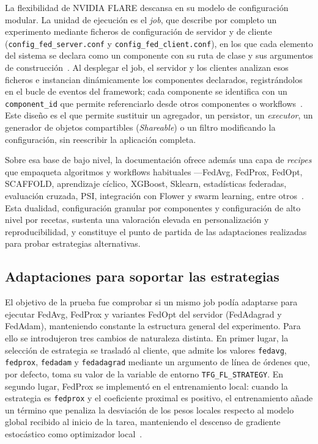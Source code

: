 La flexibilidad de NVIDIA FLARE descansa en su modelo de configuración modular. La
unidad de ejecución es el \textit{job}, que describe por completo un experimento
mediante ficheros de configuración de servidor y de cliente
(\texttt{config\_fed\_server.conf} y \texttt{config\_fed\_client.conf}), en los que
cada elemento del sistema se declara como un componente con su ruta de clase y sus
argumentos de construcción~\parencite{nvflareComponents}. Al desplegar el job, el
servidor y los clientes analizan esos ficheros e instancian dinámicamente los
componentes declarados, registrándolos en el bucle de eventos del framework; cada
componente se identifica con un \texttt{component\_id} que permite referenciarlo
desde otros componentes o workflows~\parencite{nvflareComponents}. Este diseño es
el que permite sustituir un agregador, un persistor, un \textit{executor}, un
generador de objetos compartibles (\textit{Shareable}) o un filtro modificando la
configuración, sin reescribir la aplicación completa.

Sobre esa base de bajo nivel, la documentación ofrece además una capa de
\textit{recipes} que empaqueta algoritmos y workflows habituales —FedAvg, FedProx,
FedOpt, SCAFFOLD, aprendizaje cíclico, XGBoost, Sklearn, estadísticas federadas,
evaluación cruzada, PSI, integración con Flower y swarm learning, entre
otros~\parencite{nvflareRecipes}. Esta dualidad, configuración granular por
componentes y configuración de alto nivel por recetas, sustenta una valoración
elevada en personalización y reproducibilidad, y constituye el punto de partida de
las adaptaciones realizadas para probar estrategias alternativas.

\subsection{Adaptaciones para soportar las estrategias}\label{subsec:flex-nvflare-adapt}

El objetivo de la prueba fue comprobar si un mismo job podía adaptarse para
ejecutar FedAvg, FedProx y variantes FedOpt del servidor (FedAdagrad y FedAdam),
manteniendo constante la estructura general del experimento. Para ello se
introdujeron tres cambios de naturaleza distinta. En primer lugar, la selección de
estrategia se trasladó al cliente, que admite los valores \texttt{fedavg},
\texttt{fedprox}, \texttt{fedadam} y \texttt{fedadagrad} mediante un argumento de
línea de órdenes que, por defecto, toma su valor de la variable de entorno
\texttt{TFG\_FL\_STRATEGY}. En segundo lugar, FedProx se implementó en el
entrenamiento local: cuando la estrategia es \texttt{fedprox} y el coeficiente
proximal es positivo, el entrenamiento añade un término que penaliza la desviación
de los pesos locales respecto al modelo global recibido al inicio de la tarea,
manteniendo el descenso de gradiente estocástico como optimizador
local~\parencite{nvflareAlgorithms}.

